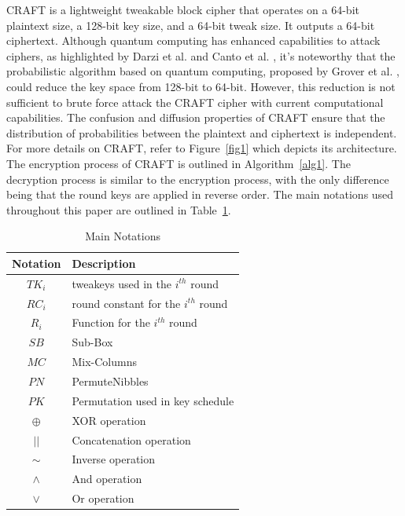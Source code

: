 \documentclass[final,5p,times,twocolumn]{elsarticle}
\begin{document}
CRAFT is a lightweight tweakable block cipher that operates on a 64-bit plaintext size, a 128-bit key size, and a 64-bit tweak size.
It outputs a 64-bit ciphertext.
Although quantum computing has enhanced capabilities to attack ciphers, as highlighted by Darzi et al. \cite{Darzi2023} and Canto et al. \cite{Canto2023a}, it's noteworthy that the probabilistic algorithm based on quantum computing, proposed by Grover et al. \cite{Grover1996}, could reduce the key space from 128-bit to 64-bit. However, this reduction is not sufficient to brute force attack the CRAFT cipher with current computational capabilities.
The confusion and diffusion properties of CRAFT ensure that the distribution of probabilities between the plaintext and ciphertext is independent.
For more details on CRAFT, refer to Figure~\ref{fig1} which depicts its architecture.
The encryption process of CRAFT is outlined in Algorithm~\ref{alg1}.
The decryption process is similar to the encryption process, with the only difference being that the round keys are applied in reverse order.
The main notations used throughout this paper are outlined in Table~\ref{tab1}.


\begin{table}[h]
    \centering
    \caption{Main Notations}\label{tab1}%
    \begin{tabular}{|c|l|}
        \hline
        Notation & Description                           \\
        \hline
        $TK_i$   & tweakeys used in the $i^{th}$ round   \\
        $RC_i$   & round constant for the $i^{th}$ round \\
        $R_i$    & Function for the $i^{th}$ round       \\
        $SB$     & Sub-Box                               \\
        $MC$     & Mix-Columns                           \\
        $PN$     & PermuteNibbles                        \\
        $PK$     & Permutation used in key schedule      \\
        $\oplus$ & XOR operation                         \\
        $||$     & Concatenation operation               \\
        $\sim$   & Inverse operation                     \\
        $\land$  & And operation                         \\
        $\lor$   & Or operation                          \\
        \hline
    \end{tabular}
\end{table}
\end{document}
